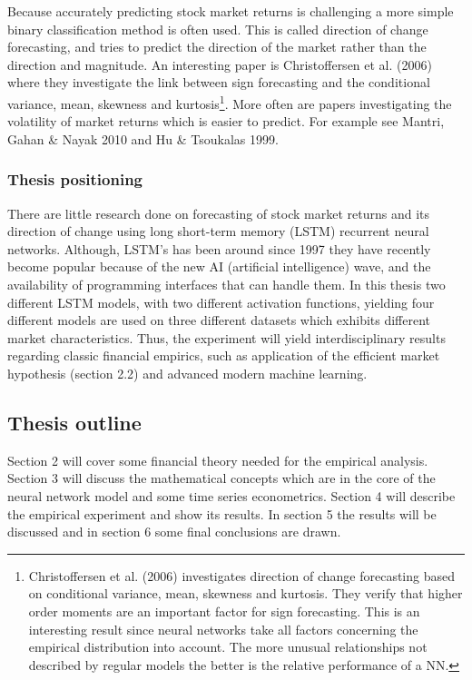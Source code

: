 \documentclass[12pt, letterpaper]{amsart}%
\begin{document}
Because accurately predicting stock market returns is challenging a more simple binary classification method is often used. This is called direction of change forecasting, and tries to predict the direction of the market rather than the direction and magnitude. An interesting paper is Christoffersen et al. (2006) where they investigate the link between sign forecasting and the conditional variance, mean, skewness and kurtosis\footnote{Christoffersen et al. (2006) investigates direction of change forecasting based on conditional variance, mean, skewness and kurtosis. They verify that higher order moments are an important factor for sign forecasting. This is an interesting result since neural networks take all factors concerning the empirical distribution into account. The more unusual relationships not described by regular models the better is the relative performance of a NN.}. More often are papers investigating the volatility of market returns which is easier to predict. For example see Mantri, Gahan \& Nayak 2010 and Hu \& Tsoukalas 1999.

\subsubsection{Thesis positioning}
There are little research done on forecasting of stock market returns and its direction of change using long short-term memory (LSTM) recurrent neural networks. Although, LSTM's has been around since 1997 they have recently become popular because of the new AI (artificial intelligence) wave, and the availability of programming interfaces that can handle them. In this thesis two different LSTM models, with two different activation functions, yielding four different models are used on three different datasets which exhibits different market characteristics. Thus, the experiment will yield interdisciplinary results regarding classic financial empirics, such as application of the efficient market hypothesis (section 2.2) and advanced modern machine learning.

\subsection{Thesis outline}
Section 2 will cover some financial theory needed for the empirical analysis. Section 3 will discuss the mathematical concepts which are in the core of the neural network model and some time series econometrics. Section 4 will describe the empirical experiment and show its results. In section 5 the results will be discussed and in section 6 some final conclusions are drawn.
\end{document}
